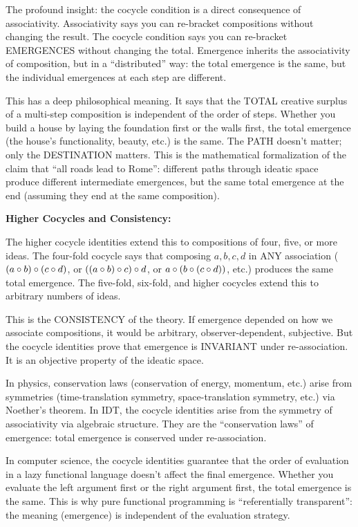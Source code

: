 \begin{interpretation}
The profound insight: the cocycle condition is a direct consequence of associativity.
Associativity says you can re-bracket compositions without changing the result.
The cocycle condition says you can re-bracket EMERGENCES without changing the
total. Emergence inherits the associativity of composition, but in a ``distributed''
way: the total emergence is the same, but the individual emergences at each step
are different.

This has a deep philosophical meaning. It says that the TOTAL creative surplus
of a multi-step composition is independent of the order of steps. Whether you
build a house by laying the foundation first or the walls first, the total
emergence (the house's functionality, beauty, etc.) is the same. The PATH doesn't
matter; only the DESTINATION matters. This is the mathematical formalization of
the claim that ``all roads lead to Rome'': different paths through ideatic space
produce different intermediate emergences, but the same total emergence at the
end (assuming they end at the same composition).

\textbf{Higher Cocycles and Consistency:}

The higher cocycle identities extend this to compositions of four, five, or more
ideas. The four-fold cocycle says that composing $a, b, c, d$ in ANY association
($(a \circ b) \circ (c \circ d)$, or $((a \circ b) \circ c) \circ d$,
or $a \circ (b \circ (c \circ d))$, etc.) produces the same total
emergence. The five-fold, six-fold, and higher cocycles extend this to arbitrary
numbers of ideas.

This is the CONSISTENCY of the theory. If emergence depended on how we associate
compositions, it would be arbitrary, observer-dependent, subjective. But the
cocycle identities prove that emergence is INVARIANT under re-association. It
is an objective property of the ideatic space.

In physics, conservation laws (conservation of energy, momentum, etc.) arise from
symmetries (time-translation symmetry, space-translation symmetry, etc.) via
Noether's theorem. In IDT, the cocycle identities arise from the symmetry of
associativity via algebraic structure. They are the ``conservation laws'' of
emergence: total emergence is conserved under re-association.

In computer science, the cocycle identities guarantee that the order of evaluation
in a lazy functional language doesn't affect the final emergence. Whether you
evaluate the left argument first or the right argument first, the total emergence
is the same. This is why pure functional programming is ``referentially transparent'':
the meaning (emergence) is independent of the evaluation strategy.


\end{interpretation}
